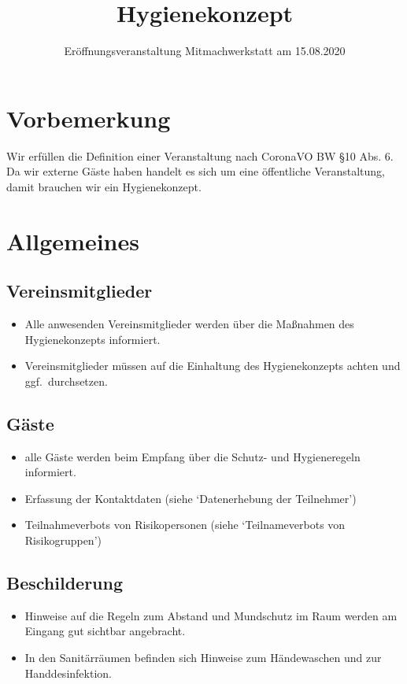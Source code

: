 \documentclass[10pt,a4paper]{scrartcl}
\title{Hygienekonzept}
\subtitle{Eröffnungsveranstaltung Mitmachwerkstatt am 15.08.2020}
\date{\vspace{-8ex}}
\begin{document}

\maketitle
\section{Vorbemerkung}
Wir erfüllen die Definition einer Veranstaltung nach CoronaVO BW §10 Abs. 6.
Da wir externe Gäste haben handelt es sich um eine öffentliche Veranstaltung, damit brauchen wir ein Hygienekonzept.




\section{Allgemeines}
\subsection{Vereinsmitglieder}
\begin{itemize}
\item Alle anwesenden Vereinsmitglieder werden über die Maßnahmen des Hygienekonzepts informiert.
\item Vereinsmitglieder müssen auf die Einhaltung des Hygienekonzepts achten und ggf.\ durchsetzen.
\end{itemize}


\subsection{Gäste}
\begin{itemize}
\item alle Gäste werden beim Empfang über die Schutz- und Hygieneregeln informiert.
\item Erfassung der Kontaktdaten (siehe `Datenerhebung der Teilnehmer')
\item Teilnahmeverbots von Risikopersonen (siehe `Teilnameverbots von Risikogruppen')
\end{itemize}

\subsection{Beschilderung}
\begin{itemize}
\item Hinweise auf die Regeln zum Abstand und Mundschutz im Raum werden am Eingang gut sichtbar angebracht.
\item In den Sanitärräumen befinden sich Hinweise zum Händewaschen und zur Handdesinfektion.
\end{itemize}
\end{document}
